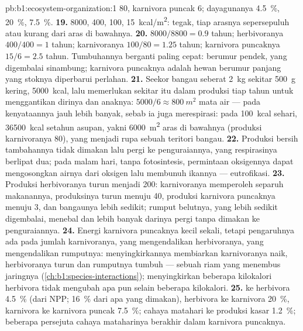 \begin{solution}{pb:b1:ecosystem-organization:1}
\qty{80}{}, karnivora puncak \qty{6}{}; dayagunanya \qty{4.5}{\%},
\qty{20}{\%}, \qty{7.5}{\%}.
\textbf{19.} \qty{8000}{}, \qty{400}{}, \qty{100}{}, \qty{15}{kcal/m^2}:
tegak, tiap arasnya sepersepuluh atau kurang dari aras di bawahnya.
\textbf{20.}  $8000/8800 = 0.9$ tahun; herbivoranya $400/400 =
1$ tahun; karnivoranya $100/80 = 1.25$ tahun; karnivora puncaknya $15/6 =
2.5$ tahun. Tumbuhannya berganti paling cepat:  berumur pendek,
yang digembalai sinambung; karnivora puncaknya adalah hewan berumur
panjang yang stoknya diperbarui perlahan.
\textbf{21.} Seekor bangau seberat \qty{2}{kg} sekitar \qty{500}{g}
kering, \qty{5000}{kcal}, lalu memerlukan sekitar itu dalam produksi
tiap tahun untuk menggantikan dirinya dan anaknya:
$5000/6 \approx \qty{800}{m^2}$ mata air --- pada kenyataannya jauh
lebih banyak, sebab
ia juga merespirasi: pada \qty{100}{kcal} sehari, \qty{36500}{kcal}
setahun asupan, yakni \qty{6000}{m^2} aras di bawahnya (produksi
karnivoranya \qty{80}{}), yang menjadi rupa sebuah teritori bangau.
\textbf{22.} Produksi bersih tambahannya tidak dimakan lalu pergi ke
penguraiannya, yang respirasinya berlipat dua; pada malam hari, tanpa
fotosintesis, permintaan oksigennya dapat mengosongkan airnya dari
oksigen lalu membunuh ikannya --- eutrofikasi.
\textbf{23.} Produksi herbivoranya turun menjadi \qty{200}{}:
karnivoranya memperoleh separuh makanannya, produksinya turun menuju
\qty{40}{}, produksi karnivora puncaknya menuju 3, dan bangaunya lebih
sedikit; rumput belutnya, yang lebih sedikit digembalai, menebal dan
lebih banyak darinya pergi tanpa dimakan ke penguraiannya.
\textbf{24.} Energi karnivora puncaknya kecil sekali, tetapi
pengaruhnya ada pada jumlah karnivoranya, yang mengendalikan
herbivoranya, yang mengendalikan rumputnya: menyingkirkannya
membiarkan karnivoranya naik, herbivoranya turun dan rumputnya tumbuh
--- sebuah riam yang menembus jaringnya
(\cref{ch:b1:species-interactions}); menyingkirkan beberapa kilokalori
herbivora tidak mengubah apa pun selain beberapa kilokalori.
\textbf{25.}  ke herbivora \qty{4.5}{\%} (dari NPP;
\qty{16}{\%} dari apa yang dimakan), herbivora ke karnivora
\qty{20}{\%}, karnivora ke karnivora puncak \qty{7.5}{\%}; cahaya
matahari ke produksi kasar \qty{1.2}{\%}; beberapa persejuta cahaya
mataharinya berakhir dalam karnivora puncaknya.
\end{solution}
